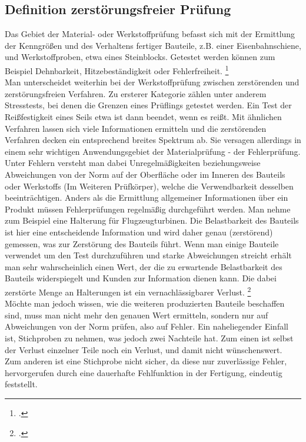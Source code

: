 \documentclass[reducespace,stylepage,semiarbeit]{spezidoc}
\begin{document}
\subsection{Definition zerstörungsfreier Prüfung}
Das Gebiet der Material- oder Werkstoffprüfung befasst sich mit der Ermittlung der Kenngrößen und des Verhaltens fertiger Bauteile, z.B. einer Eisenbahnschiene, und Werkstoffproben, etwa eines Steinblocks. 
Getestet werden können zum Beispiel Dehnbarkeit, Hitzebeständigkeit oder Fehlerfreiheit. \footcite{theorie}\\ 
Man unterscheidet weiterhin bei der Werkstoffprüfung zwischen zerstörenden und zerstörungsfreien Verfahren. 
Zu ersterer Kategorie zählen unter anderem Stresstests, bei denen die Grenzen eines Prüflings getestet werden. 
Ein Test der Reißfestigkeit eines Seils etwa ist dann beendet, wenn es reißt. 
Mit ähnlichen Verfahren lassen sich viele Informationen ermitteln und die zerstörenden Verfahren decken ein entsprechend breites Spektrum ab. 
Sie versagen allerdings in einem sehr wichtigen Anwendungsgebiet der Materialprüfung - der Fehlerprüfung.\\
Unter Fehlern versteht man dabei Unregelmäßigkeiten beziehungsweise Abweichungen von der Norm auf der Oberfläche oder im Inneren des Bauteils oder Werkstoffs (Im Weiteren Prüfkörper), welche die Verwendbarkeit desselben beeinträchtigen. 
Anders als die Ermittlung allgemeiner Informationen über ein Produkt müssen Fehlerprüfungen regelmäßig durchgeführt werden. 
Man nehme zum Beispiel eine Halterung für Flugzeugturbinen. 
Die Belastbarkeit des Bauteils ist hier eine entscheidende Information und wird daher genau (zerstörend) gemessen, was zur Zerstörung des Bauteils führt. 
Wenn man einige Bauteile verwendet um den Test durchzuführen und starke Abweichungen streicht erhält man sehr wahrscheinlich einen Wert, der die zu erwartende Belastbarkeit des Bauteils widerspiegelt und Kunden zur Information dienen kann. %
Die dabei zerstörte Menge an Halterungen ist ein vernachlässigbarer Verlust. \footcite{zfp-abgrenzung}\\
Möchte man jedoch wissen, wie die weiteren produzierten Bauteile beschaffen sind, muss man nicht mehr den genauen Wert ermitteln, sondern nur auf Abweichungen von der Norm prüfen, also auf Fehler. 
Ein naheliegender Einfall ist, Stichproben zu nehmen, was jedoch zwei Nachteile hat. Zum einen ist selbst der Verlust einzelner Teile noch ein Verlust, und damit nicht wünschenswert.
Zum anderen ist eine Stichprobe nicht sicher, da diese nur zuverlässige Fehler, hervorgerufen durch eine dauerhafte Fehlfunktion in der Fertigung, eindeutig feststellt.\\
\end{document}
